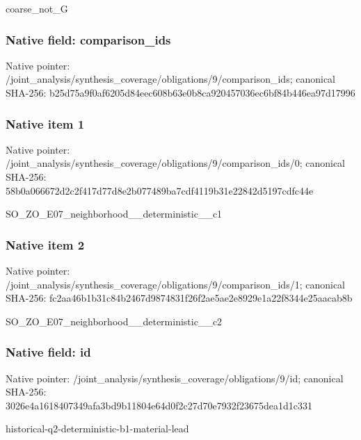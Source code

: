 \documentclass[10pt,a4paper]{article}
\begin{document}
\begingroup\raggedright\sloppy coarse\_\allowbreak{}not\_\allowbreak{}G\par\endgroup

\subsubsection{Native field: comparison\_\allowbreak{}ids}
Native pointer: /joint\_\allowbreak{}analysis/synthesis\_\allowbreak{}coverage/obligations/9/comparison\_\allowbreak{}ids; canonical SHA-256: b25d75a9f0af6205d84eec608b63e0b8ca920457036ec6bf84b446ea97d17996

\subsubsection{Native item 1}
Native pointer: /joint\_\allowbreak{}analysis/synthesis\_\allowbreak{}coverage/obligations/9/comparison\_\allowbreak{}ids/0; canonical SHA-256: 58b0a066672d2c2f417d77d8e2b077489ba7cdf4119b31e22842d5197cdfc44e

\begingroup\raggedright\sloppy SO\_\allowbreak{}ZO\_\allowbreak{}E07\_\allowbreak{}neighborhood\_\allowbreak{}\_\allowbreak{}deterministic\_\allowbreak{}\_\allowbreak{}c1\par\endgroup

\subsubsection{Native item 2}
Native pointer: /joint\_\allowbreak{}analysis/synthesis\_\allowbreak{}coverage/obligations/9/comparison\_\allowbreak{}ids/1; canonical SHA-256: fc2aa46b1b31c84b2467d9874831f26f2ae5ae2e8929e1a22f8344e25aacab8b

\begingroup\raggedright\sloppy SO\_\allowbreak{}ZO\_\allowbreak{}E07\_\allowbreak{}neighborhood\_\allowbreak{}\_\allowbreak{}deterministic\_\allowbreak{}\_\allowbreak{}c2\par\endgroup

\subsubsection{Native field: id}
Native pointer: /joint\_\allowbreak{}analysis/synthesis\_\allowbreak{}coverage/obligations/9/id; canonical SHA-256: 3026e4a1618407349afa3bd9b11804e64d0f2c27d70e7932f23675dea1d1c331

\begingroup\raggedright\sloppy historical-q2-deterministic-b1-material-lead\par\endgroup
\end{document}
